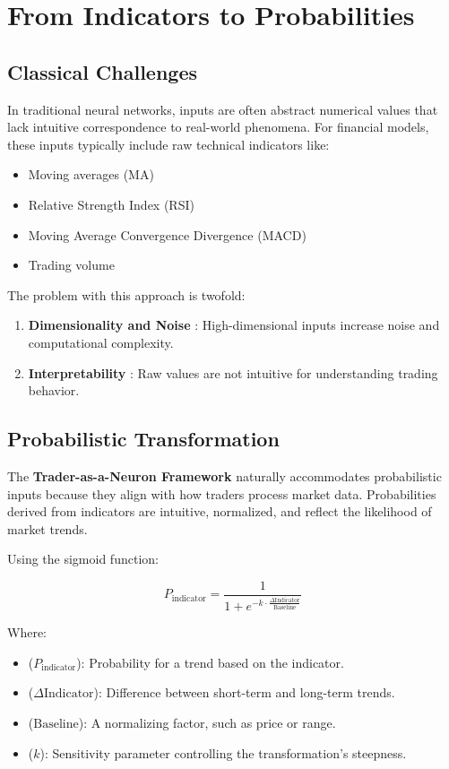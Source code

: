 \documentclass[a4]{article}
\newcommand{\bn}{\bigskip\noindent}
\begin{document}
\section{From Indicators to Probabilities}

\subsection{Classical Challenges}

In traditional neural networks, inputs are often abstract numerical values that lack intuitive correspondence to real-world phenomena. For financial models, these inputs typically include raw technical indicators like:

\begin{itemize}
\item  Moving averages (MA)
\item Relative Strength Index (RSI)
\item Moving Average Convergence Divergence (MACD)
\item Trading volume
\end{itemize}

The problem with this approach is twofold:
\begin{enumerate}[1.]
\item {\bf Dimensionality and Noise} : High-dimensional inputs increase noise and computational complexity.
\item {\bf Interpretability} : Raw values are not intuitive for understanding trading behavior.
\end{enumerate}


\subsection{Probabilistic Transformation}

The {\bf Trader-as-a-Neuron Framework}  naturally accommodates probabilistic inputs because they align with how traders process market data. Probabilities derived from indicators are intuitive, normalized, and reflect the likelihood of market trends.

\bn
Using the sigmoid function:

$$
P_{\text{indicator}} = \frac{1}{1 + e^{\displaystyle -k \cdot \frac{\Delta \text{Indicator}}{\text{Baseline}}}}
$$

Where:

\begin{itemize}
\item  ($P_{\text{indicator}}$): Probability for a trend based on the indicator.
\item  ($\Delta \text{Indicator}$): Difference between short-term and long-term trends.
\item  ($\text{Baseline}$): A normalizing factor, such as price or range.
\item  ($k$): Sensitivity parameter controlling the transformation's steepness.
\end{itemize}
\end{document}
